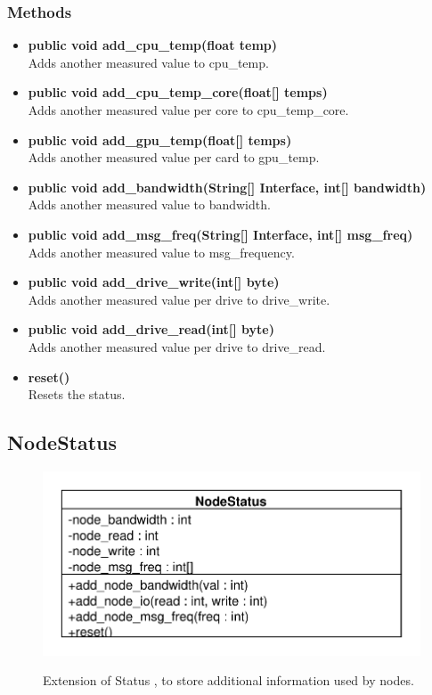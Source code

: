 \subsubsection{Methods}
\begin{itemize}
	\item \textbf{public void add\_cpu\_temp(float temp)}\\
	Adds another measured value to cpu\_temp.
	\item \textbf{public void add\_cpu\_temp\_core(float[] temps)}\\
	Adds another measured value per core to cpu\_temp\_core.
	\item \textbf{public void add\_gpu\_temp(float[] temps)}\\
	Adds another measured value per card to gpu\_temp.
	\item \textbf{public void add\_bandwidth(String[] Interface, int[] bandwidth)}\\
	Adds another measured value to bandwidth.
	\item \textbf{public void add\_msg\_freq(String[] Interface, int[] msg\_freq)}\\
	Adds another measured value to msg\_frequency.
	\item \textbf{public void add\_drive\_write(int[] byte)}\\
	Adds another measured value per drive to drive\_write.
	\item \textbf{public void add\_drive\_read(int[] byte)}\\
	Adds another measured value per drive to drive\_read.
	\item \textbf{reset()}\\
	Resets the status.
\end{itemize}

\subsection{NodeStatus}
\begin{figure}[htbp]
	\begin{minipage}[t]{7cm}
		\vspace{0pt}
		\centering
		\includegraphics[scale=0.6]{./diagram_pictures/NodeInterface/NodeStatus.pdf}
	\end{minipage}
	\hfill
	\begin{minipage}[t]{7cm}
		\vspace{10pt}
		Extension of Status , to store additional information used by nodes.
	\end{minipage}
\end{figure}



